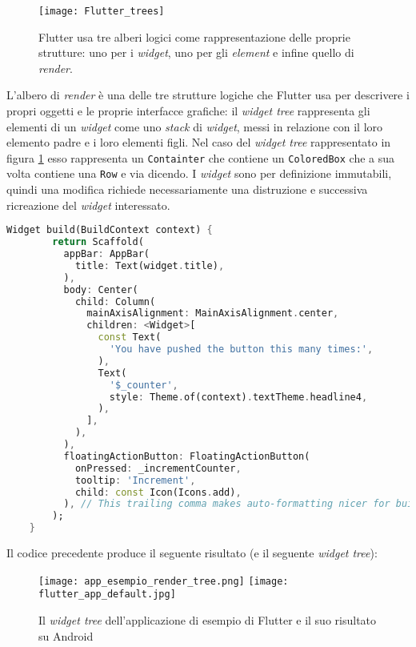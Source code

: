 \begin{figure}[H]
    \centering
    \texttt{[image: Flutter\_trees]}
    \caption[I tre alberi di Flutter]{Flutter usa tre alberi logici come rappresentazione delle proprie strutture: uno per i \textit{widget}, uno per gli \textit{element} e infine quello di \textit{render}.\footnotemark}
    \label{fig:flutter-trees}
\end{figure}

L'albero di \textit{render} è una delle tre strutture logiche che Flutter usa per descrivere i propri oggetti e le proprie interfacce grafiche: il \textit{widget tree} rappresenta gli elementi di un \textit{widget} come uno \textit{stack} di \textit{widget}, messi in relazione con il loro elemento padre e i loro elementi figli. Nel caso del \textit{widget tree} rappresentato in figura \ref{fig:flutter-trees} esso rappresenta un \verb+Containter+ che contiene un \verb+ColoredBox+ che a sua volta contiene una \verb+Row+ e via dicendo. I \textit{widget} sono per definizione immutabili, quindi una modifica richiede necessariamente una distruzione e successiva ricreazione del \textit{widget} interessato.

\begin{lstlisting}[language=dart, caption={Codice rilevante per la parte grafica dell'\textit{app} di esempio di Flutter}]
    Widget build(BuildContext context) {
        return Scaffold(
          appBar: AppBar(
            title: Text(widget.title),
          ),
          body: Center(
            child: Column(
              mainAxisAlignment: MainAxisAlignment.center,
              children: <Widget>[
                const Text(
                  'You have pushed the button this many times:',
                ),
                Text(
                  '$_counter',
                  style: Theme.of(context).textTheme.headline4,
                ),
              ],
            ),
          ),
          floatingActionButton: FloatingActionButton(
            onPressed: _incrementCounter,
            tooltip: 'Increment',
            child: const Icon(Icons.add),
          ), // This trailing comma makes auto-formatting nicer for build methods.
        );
    }
\end{lstlisting}

Il codice precedente produce il seguente risultato (e il seguente \textit{widget tree}):

\begin{figure}[H]
    \centering
    \texttt{[image: app\_esempio\_render\_tree.png]}\hspace{15mm}
    \texttt{[image: flutter\_app\_default.jpg]}
    \caption[\textit{Widget tree} app esempio]{Il \textit{widget tree} dell'applicazione di esempio di Flutter e il suo risultato su Android}
\end{figure}

